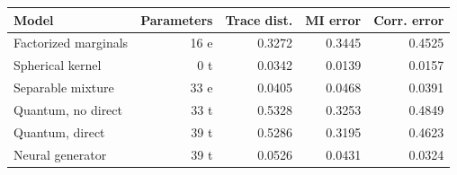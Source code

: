 \begin{tabular}{lrrrr}
\toprule
Model & Parameters & Trace dist. & MI error & Corr. error \\
\midrule
Factorized marginals & 16 e & 0.3272 & 0.3445 & 0.4525 \\
Spherical kernel & 0 t & 0.0342 & 0.0139 & 0.0157 \\
Separable mixture & 33 e & 0.0405 & 0.0468 & 0.0391 \\
Quantum, no direct & 33 t & 0.5328 & 0.3253 & 0.4849 \\
Quantum, direct & 39 t & 0.5286 & 0.3195 & 0.4623 \\
Neural generator & 39 t & 0.0526 & 0.0431 & 0.0324 \\
\bottomrule
\end{tabular}
